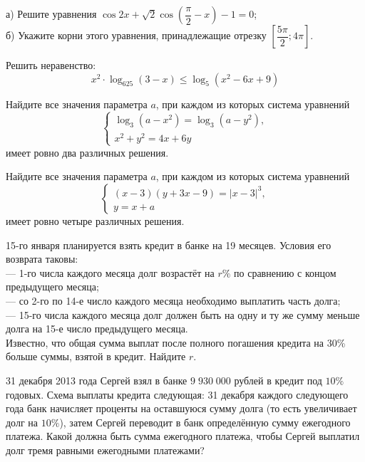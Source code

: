 \begin{class}[number=7]
	\begin{listofex}
		\item
		а) Решите уравнения \( \cos2x+\sqrt{2}\cos\left( \dfrac{\pi}{2}-x \right)-1=0 \);\\
		б) Укажите корни этого уравнения, принадлежащие отрезку \( \left[ \dfrac{5\pi}{2};4\pi \right] \).
		\item Решить неравенство:
		\[ x^2\cdot\log_{625}(3-x)\le\log_5(x^2-6x+9) \]
		\item Найдите все значения параметра \( a \), при каждом из которых система уравнений
		\[ \left\{
		\begin{array}{l}
			\log_3(a-x^2)=\log_3(a-y^2),\\
			x^2+y^2=4x+6y
		\end{array}
		\right. \]
		имеет ровно два различных решения.
		\item Найдите все значения параметра \( a \), при каждом из которых система уравнений
		\[ \left\{
		\begin{array}{l}
			(x-3)(y+3x-9)=|x-3|^3,\\
			y=x+a
		\end{array}
		\right. \]
		имеет ровно четыре различных решения.
		\item 15-го января планируется взять кредит в банке на 19 месяцев. Условия его возврата таковы:\\
		--- 1-го числа каждого месяца долг возрастёт на \( r\% \) по сравнению с концом предыдущего месяца;\\
		--- со 2-го по 14-е число каждого месяца необходимо выплатить часть долга;\\
		--- 15-го числа каждого месяца долг должен быть на одну и ту же сумму меньше долга на 15-е число предыдущего месяца.\\
		Известно, что общая сумма выплат после полного погашения кредита на 30\% больше суммы, взятой в кредит. Найдите \( r \).
		\item 31 декабря 2013 года Сергей взял в банке \( 9\;930\;000 \) рублей в кредит под \( 10\% \) годовых. Схема выплаты кредита следующая: 31 декабря каждого следующего года банк начисляет проценты на оставшуюся сумму долга (то есть увеличивает долг на \( 10\% \)), затем Сергей переводит в банк определённую сумму ежегодного платежа. Какой должна быть сумма ежегодного платежа, чтобы Сергей выплатил долг тремя равными ежегодными платежами?
	\end{listofex}
\end{class}

